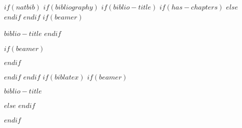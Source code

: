 $if(natbib)$
$if(bibliography)$
$if(biblio-title)$
$if(has-chapters)$
\renewcommand\bibname{$biblio-title$}
$else$
\renewcommand\refname{$biblio-title$}
$endif$
$endif$
$if(beamer)$
\begin{frame}[allowframebreaks]{$biblio-title$}
    \bibliographytrue
    $endif$
    
    $if(beamer)$
\end{frame}
$endif$

$endif$
$endif$
$if(biblatex)$
$if(beamer)$
\begin{frame}[allowframebreaks]{$biblio-title$}
    \bibliographytrue
    \printbibliography[heading=none]
\end{frame}
$else$
$endif$

$endif$